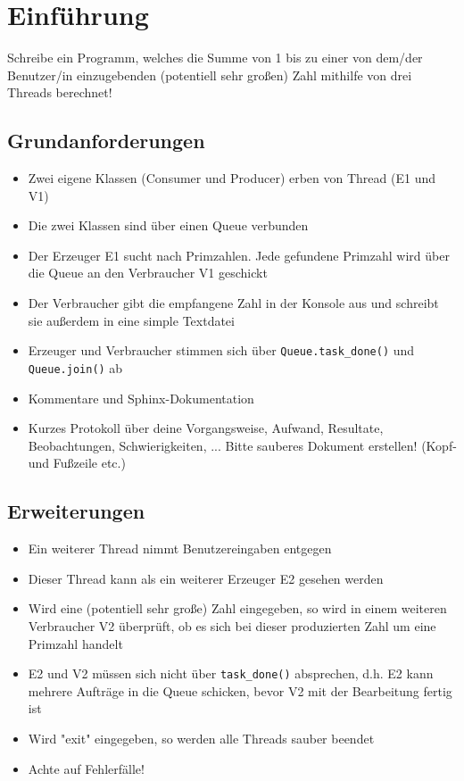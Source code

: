 
\section{Einführung}
Schreibe ein Programm, welches die Summe von 1 bis zu einer von dem/der Benutzer/in einzugebenden (potentiell sehr großen) Zahl mithilfe von drei Threads berechnet!

\subsection{Grundanforderungen}

\begin{itemize}
	\item Zwei eigene Klassen (Consumer und Producer) erben von Thread (E1 und V1)
	\item Die zwei Klassen sind über einen Queue verbunden
	\item Der Erzeuger E1 sucht nach Primzahlen. Jede gefundene Primzahl wird über die Queue an den Verbraucher V1 geschickt
	\item Der Verbraucher gibt die empfangene Zahl in der Konsole aus und schreibt sie außerdem in eine simple Textdatei
	\item Erzeuger und Verbraucher stimmen sich über \verb|Queue.task_done()| und \verb|Queue.join()| ab
	\item Kommentare und Sphinx-Dokumentation
	\item Kurzes Protokoll über deine Vorgangsweise, Aufwand, Resultate, Beobachtungen, Schwierigkeiten, ... Bitte sauberes Dokument erstellen! (Kopf- und Fußzeile etc.)
\end{itemize}


\subsection{Erweiterungen}
\begin{itemize}
	\item Ein weiterer Thread nimmt Benutzereingaben entgegen
	\item Dieser Thread kann als ein weiterer Erzeuger E2 gesehen werden
	\item Wird eine (potentiell sehr große) Zahl eingegeben, so wird in einem weiteren Verbraucher V2 überprüft, ob es sich bei dieser produzierten Zahl um eine Primzahl handelt
	\item E2 und V2 müssen sich nicht über \verb|task_done()| absprechen, d.h. E2 kann mehrere Aufträge in die Queue schicken, bevor V2 mit der Bearbeitung fertig ist
	\item Wird "exit" eingegeben, so werden alle Threads sauber beendet
	\item Achte auf Fehlerfälle!
\end{itemize}
\clearpage
